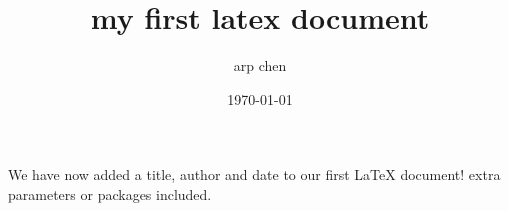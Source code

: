 \documentclass[12pt,a4paper]{article}
\begin{document}
\title{my first latex document}
\author{arp chen}
\date{\today}
\maketitle
We have now added a title, author and date to our first \LaTeX{} document!
extra parameters or packages included.
\end{document}
